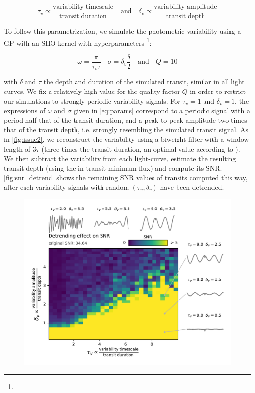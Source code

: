 \documentclass{aastex631}
\begin{document}
\begin{equation}
    \tau_v \propto \frac{\mathrm{variability\; timescale}}{\mathrm{transit\;duration}} \quad \text{and} \quad 
    \delta_v \propto \frac{\mathrm{variability\; amplitude}}{\mathrm{transit\;depth}} 
\end{equation}

To follow this parametrization, we simulate the photometric variability using a GP with an SHO kernel with hyperparameters \footnote{}:

\begin{equation}\label{eq:params}
    \omega = \frac{\pi}{\tau_v\tau} \quad 
    \sigma = \delta_v \frac{\delta}{2} \quad  \text{and}  \quad  
    Q = 10
\end{equation}

with $\delta$ and $\tau$ the depth and duration of the simulated transit, similar in all light curves. We fix a relatively high value for the quality factor $Q$ in order to restrict our simulations to strongly periodic variability signals. For $\tau_v=1$ and $\delta_v=1$, the expressions of $\omega$ and $\sigma$ given in \autoref{eq:params} correspond to a periodic signal with a period half that of the transit duration, and a peak to peak amplitude two times that of the transit depth, i.e. strongly resembling the simulated transit signal. As in \autoref{fig:issue2}, we reconstruct the variability using a biweight filter with a window length of $3\tau$ (three times the transit duration, an optimal value according to \citealt{wotan}). We then subtract the variability from each light-curve, estimate the resulting transit depth (using the in-transit minimum flux) and compute its SNR. \autoref{fig:snr_detrend} shows the remaining SNR values of transits computed this way, after each variability signals with random $(\tau_v, \delta_v)$ have been detrended.
\begin{figure}[H]
    \begin{centering}
        \includegraphics[height=9cm]{../../workflows/cleaning_snr/figures/simu1/result.pdf}
        \caption{}
        \label{fig:snr_detrend}
    \end{centering}
\end{figure}
\end{document}
